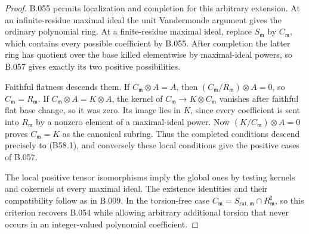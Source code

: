 \begin{proof}
B.055 permits localization and completion for this
arbitrary extension. At an infinite-residue maximal
ideal the unit Vandermonde argument gives the ordinary
polynomial ring. At a finite-residue maximal ideal,
replace $S_{\mathfrak m}$ by $C_{\mathfrak m}$, which
contains every possible coefficient by B.055.
After completion the latter ring has quotient over
the base killed elementwise by maximal-ideal powers,
so B.057 gives exactly its two positive possibilities.

Faithful flatness descends them. If
$C_{\mathfrak m}\otimes A=A$, then
$(C_{\mathfrak m}/R_{\mathfrak m})\otimes A=0$,
so $C_{\mathfrak m}=R_{\mathfrak m}$.
If $C_{\mathfrak m}\otimes A=K\otimes A$, the
kernel of $C_{\mathfrak m}\to K\otimes C_{\mathfrak m}$
vanishes after faithful flat base change, so it was
zero. Its image lies in $K$, since every coefficient
is sent into $R_{\mathfrak m}$ by a nonzero element
of a maximal-ideal power. Now
$(K/C_{\mathfrak m})\otimes A=0$ proves
$C_{\mathfrak m}=K$ as the canonical subring.
Thus the completed conditions descend precisely
to (B58.1), and conversely these local conditions
give the positive cases of B.057.

The local positive tensor isomorphisms imply the
global ones by testing kernels and cokernels at
every maximal ideal. The existence identities
and their compatibility follow as in B.009.
In the torsion-free case
$C_{\mathfrak m}=S_{\mathrm{rat},\mathfrak m}
\cap R_{\mathfrak m}^{\sharp}$, so this criterion
recovers B.054 while allowing arbitrary additional
torsion that never occurs in an integer-valued
polynomial coefficient.
\end{proof}
